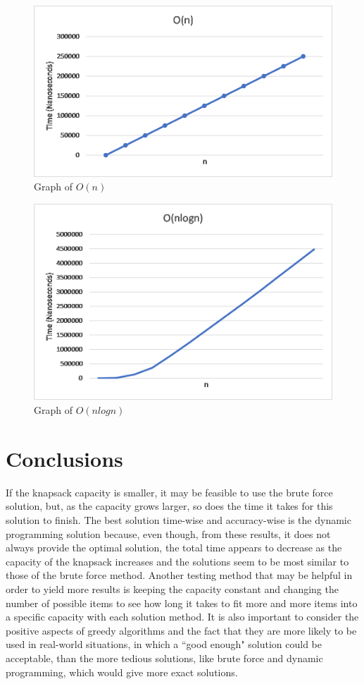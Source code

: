\documentclass[onecolumn, letterpaper, 12pt]{article}
\begin{document}
\begin{figure}[H]
\centering
\includegraphics[width=0.8\linewidth]{./On.png}
\caption{Graph of $O(n)$}
\label{fig:On}
\end{figure}

\begin{figure}[H]
\centering
\includegraphics[width=0.8\linewidth]{./Onlgn.png}
\caption{Graph of $O(nlogn)$}
\label{fig:Onlgn}
\end{figure}

\section{Conclusions}
If the knapsack capacity is smaller, it may be feasible to use the brute force solution, but, as the capacity grows larger, so does the time it takes for this solution to finish. The best solution time-wise and accuracy-wise is the dynamic programming solution because, even though, from these results, it does not always provide the optimal solution, the total time appears to decrease as the capacity of the knapsack increases and the solutions seem to be most similar to those of the brute force method. Another testing method that may be helpful in order to yield more results is keeping the capacity constant and changing the number of possible items to see how long it takes to fit more and more items into a specific capacity with each solution method. It is also important to consider the positive aspects of greedy algorithms and the fact that they are more likely to be used in real-world situations, in which a ``good enough" solution could be acceptable, than the more tedious solutions, like brute force and dynamic programming, which would give more exact solutions.
\end{document}

